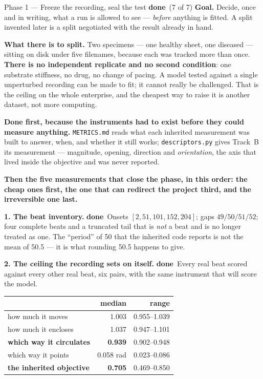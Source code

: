 \documentclass[11pt,a4paper]{article}
\newcommand{\code}[1]{\texttt{#1}}
\newcommand{\dn}{\textcolor{good}{\textbf{done}}}
\begin{document}
\begin{phasebox}{Phase 1 --- Freeze the recording, seal the test \hfill \dn\ (7 of 7)}
\textbf{Goal.} Decide, once and in writing, what a run is allowed to see --- \emph{before} anything
is fitted. A split invented later is a split negotiated with the result already in hand.

\textbf{What there is to split.} Two specimens --- one healthy sheet, one diseased --- sitting on
disk under five filenames, because each was tracked more than once. \textbf{There is no independent
replicate and no second condition}: one substrate stiffness, no drug, no change of pacing. A model
tested against a single unperturbed recording can be made to fit; it cannot really be challenged.
That is the ceiling on the whole enterprise, and the cheapest way to raise it is another dataset,
not more computing.

\textbf{Done first, because the instruments had to exist before they could measure anything.}
\code{METRICS.md} reads what each inherited measurement was built to answer, when, and whether it
still works; \code{descriptors.py} gives Track~B its measurement --- magnitude, opening, direction
and \emph{orientation}, the axis that lived inside the objective and was never reported.

\textbf{Then the five measurements that close the phase, in this order: the cheap ones first, the
one that can redirect the project third, and the irreversible one last.}

\textbf{1. The beat inventory.} \dn\ Onsets $[2, 51, 101, 152, 204]$; gaps $49/50/51/52$; four
complete beats and a truncated tail that is \emph{not} a beat and is no longer treated as one. The
``period'' of 50 that the inherited code reports is not the mean of 50.5 --- it is what rounding
50.5 happens to give.

\textbf{2. The ceiling the recording sets on itself.} \dn\ Every real beat scored against every
other real beat, six pairs, with the same instrument that will score the model.

\begin{center}\small
\begin{tabular}{@{}l r r@{}}
\toprule
& \textbf{median} & \textbf{range}\\
\midrule
how much it moves & 1.003 & 0.955--1.039\\
how much it encloses & 1.037 & 0.947--1.101\\
\textbf{which way it circulates} & \textbf{0.939} & 0.902--0.948\\
which way it points & 0.058 rad & 0.023--0.086\\
\textbf{the inherited objective} & \textbf{0.705} & 0.469--0.850\\
\bottomrule
\end{tabular}
\end{center}


\end{phasebox}
\end{document}
